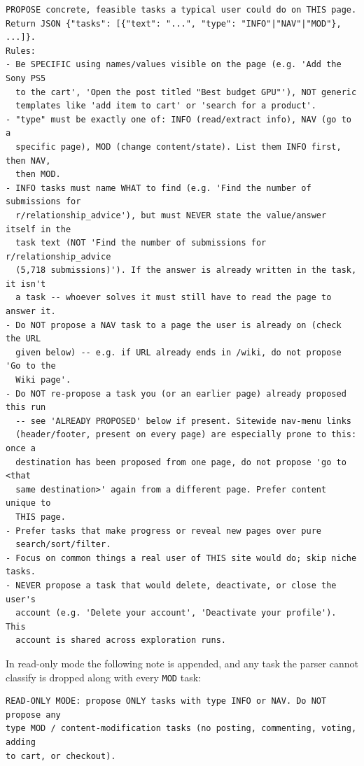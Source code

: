 \begin{lstlisting}[style=mystyle,numbers=none,basicstyle=\scriptsize\ttfamily]
PROPOSE concrete, feasible tasks a typical user could do on THIS page.
Return JSON {"tasks": [{"text": "...", "type": "INFO"|"NAV"|"MOD"}, ...]}.
Rules:
- Be SPECIFIC using names/values visible on the page (e.g. 'Add the Sony PS5
  to the cart', 'Open the post titled "Best budget GPU"'), NOT generic
  templates like 'add item to cart' or 'search for a product'.
- "type" must be exactly one of: INFO (read/extract info), NAV (go to a
  specific page), MOD (change content/state). List them INFO first, then NAV,
  then MOD.
- INFO tasks must name WHAT to find (e.g. 'Find the number of submissions for
  r/relationship_advice'), but must NEVER state the value/answer itself in the
  task text (NOT 'Find the number of submissions for r/relationship_advice
  (5,718 submissions)'). If the answer is already written in the task, it isn't
  a task -- whoever solves it must still have to read the page to answer it.
- Do NOT propose a NAV task to a page the user is already on (check the URL
  given below) -- e.g. if URL already ends in /wiki, do not propose 'Go to the
  Wiki page'.
- Do NOT re-propose a task you (or an earlier page) already proposed this run
  -- see 'ALREADY PROPOSED' below if present. Sitewide nav-menu links
  (header/footer, present on every page) are especially prone to this: once a
  destination has been proposed from one page, do not propose 'go to <that
  same destination>' again from a different page. Prefer content unique to
  THIS page.
- Prefer tasks that make progress or reveal new pages over pure
  search/sort/filter.
- Focus on common things a real user of THIS site would do; skip niche tasks.
- NEVER propose a task that would delete, deactivate, or close the user's
  account (e.g. 'Delete your account', 'Deactivate your profile'). This
  account is shared across exploration runs.
\end{lstlisting}

\noindent
In read-only mode the following note is appended, and any task the parser
cannot classify is dropped along with every \texttt{MOD} task:

\begin{lstlisting}[style=mystyle,numbers=none,basicstyle=\scriptsize\ttfamily]
READ-ONLY MODE: propose ONLY tasks with type INFO or NAV. Do NOT propose any
type MOD / content-modification tasks (no posting, commenting, voting, adding
to cart, or checkout).
\end{lstlisting}

